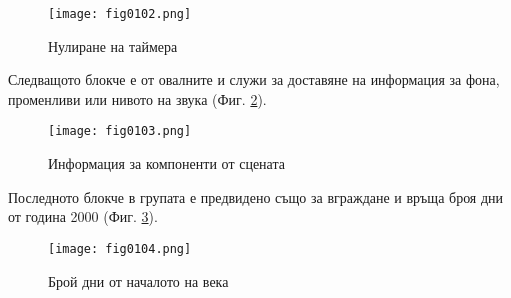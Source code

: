 \begin{figure}[H]
  \centering
  \texttt{[image: fig0102.png]}
  \caption{Нулиране на таймера}
\label{fig0102}
\end{figure}

Следващото блокче е от овалните и служи за доставяне на информация за фона, променливи или нивото на звука (Фиг. \ref{fig0103}).

\begin{figure}[H]
  \centering
  \texttt{[image: fig0103.png]}
  \caption{Информация за компоненти от сцената}
\label{fig0103}
\end{figure}

Последното блокче в групата е предвидено също за вграждане и връща броя дни от година 2000 (Фиг. \ref{fig0104}).

\begin{figure}[H]
  \centering
  \texttt{[image: fig0104.png]}
  \caption{Брой дни от началото на века}
\label{fig0104}
\end{figure}

